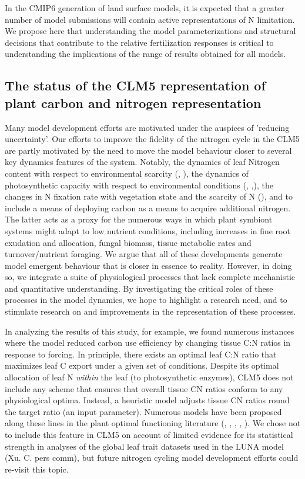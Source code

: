 \documentclass[draft,linenumbers]{agujournal}
\begin{document}
In the CMIP6 generation of land surface models, it is expected that a greater number of model submissions will contain active representations of N limitation. We propose here that understanding the model parameterizations and structural decisions that contribute to the relative fertilization responses is critical to understanding the implications of the range of results obtained for all models. 

\subsection{The status of the CLM5 representation of plant carbon and nitrogen representation}
Many model development efforts are motivated under the auspices of 'reducing uncertainty'.  Our efforts to improve the fidelity of the nitrogen cycle in the CLM5 are partly motivated by the need to move the model behaviour closer to several key dynamics features of the system. Notably, the dynamics of leaf Nitrogen content with respect to environmental scarcity (\cite{zaehle2014}, \cite{brzostek2014}), the dynamics of photosynthetic capacity with respect to environmental conditions (\cite{xu2012}, \cite{ali2016},\cite{rogers2017}), the changes in N fixation rate with vegetation state and the scarcity of N (\cite{vitousek2002}), and to include a means of deploying carbon as a means to acquire additional nitrogen. The latter acts as a proxy for the numerous ways in which plant symbiont systems might adapt to low nutrient conditions, including increases in fine root exudation and allocation, fungal biomass, tissue metabolic rates and turnover/nutrient foraging.  We argue that all of these developments generate model emergent behaviour that is closer in essence to reality. However, in doing so, we integrate a suite of physiological processes that lack complete mechanistic and quantitative understanding.  By investigating the critical roles of these processes in the model dynamics, we hope to highlight a research need, and to stimulate research on and improvements in the representation of these processes.

In analyzing the results of this study, for example, we found numerous instances where the model reduced carbon use efficiency by changing tissue C:N ratios in response to forcing. In principle, there exists an optimal leaf C:N ratio that maximizes leaf C export under a given set of conditions. Despite its optimal allocation of leaf N \emph{within} the leaf (to photosynthetic enzymes), CLM5 does not include any scheme that ensures that overall tissue CN ratios conform to any physiological optima. Instead, a heuristic model adjusts tissue CN ratios round the target ratio (an input parameter).  Numerous models have been proposed along these lines in the plant optimal functioning literature (\cite{vanwijk2003}, \cite{mcmurtrie2011}, \cite{a,nten2011} \cite{franklin2012}, \cite{mcmurtrie2013}, \cite{thomas2014}). We chose not to include this feature in CLM5 on account of limited evidence for its statistical strength in analyses of the global leaf trait datasets used in the LUNA model (Xu. C. pers comm), but future nitrogen cycling model development efforts could re-visit this topic. 
\end{document}
